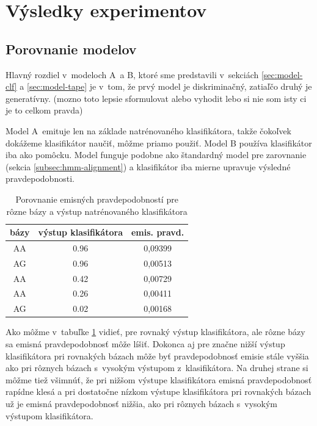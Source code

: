 \section{Výsledky experimentov}

\subsection{Porovnanie modelov}
\label{sec:cmp-model}
Hlavný rozdiel v~modeloch A~a B, ktoré sme predstavili v~sekciách \ref{sec:model-clf} a \ref{sec:model-tape} je v~tom, že prvý model je diskriminačný, zatiaľčo druhý je generatívny. (\todo mozno toto lepsie sformulovat alebo vyhodit lebo si nie som isty ci je to celkom pravda)

Model A~emituje len na základe natrénovaného klasifikátora, takže čokoľvek dokážeme klasifikátor naučiť, môžme priamo použiť. Model B používa klasifikátor iba ako pomôcku. Model funguje podobne ako štandardný model pre zarovnanie (sekcia \ref{subsec:hmm-alignment}) a klasifikátor iba mierne upravuje výsledné pravdepodobnosti.

\begin{table}
\centering
\begin{tabular}{ccc}
\toprule
bázy & výstup klasifikátora & emis. pravd.\\
\midrule
AA & 0.96 & 0,09399\\
AG & 0.96 & 0,00513\\
AA & 0.42 & 0,00729\\
AA & 0.26 & 0,00411\\
AG & 0.02 & 0,00168\\
\bottomrule
\end{tabular}
\caption[Porovnanie emisných pravdepodobností]{Porovnanie emisných pravdepodobností pre rôzne bázy a výstup natrénovaného klasifikátora}
\label{tab:emission-prob}
\end{table}

Ako môžme v~tabuľke \ref{tab:emission-prob} vidieť, pre rovnaký výstup klasifikátora, ale rôzne bázy sa emisná pravdepodobnosť môže líšiť. Dokonca aj pre značne nižší výstup klasifikátora pri rovnakých bázach môže byť pravdepodobnosť emisie stále vyššia ako pri rôznych bázach s~vysokým výstupom z~klasifikátora. Na druhej strane si môžme tiež všimnúť, že pri nižšom výstupe klasifikátora emisná pravdepodobnosť rapídne klesá a pri dostatočne nízkom výstupe klasifikátora pri rovnakých bázach už je emisná pravdepodobnosť nižšia, ako pri rôznych bázach s~vysokým výstupom klasifikátora.



